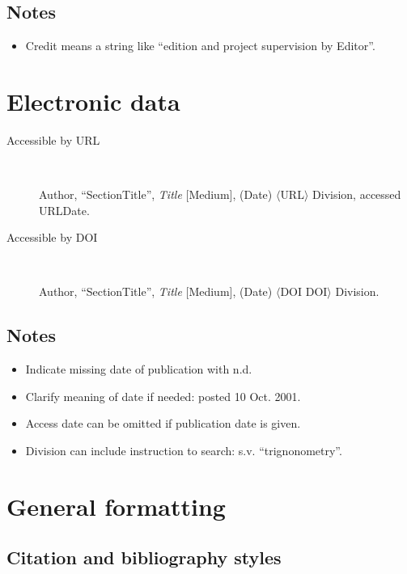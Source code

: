 \documentclass[extrafontsizes,11pt,a4paper,oneside]{memoir}
\newcommand*{\lit}[1]{\textsf{#1}}
\begin{document}
\section{Notes}

\begin{itemize}
  \item Credit means a string like \enquote{edition and project supervision by Editor}.
\end{itemize}

\chapter{Electronic data}\label{sec:electronic}

\begin{description}
  \item[Accessible by URL]~
  \par Author, \enquote{SectionTitle}, \emph{Title} [Medium], (Date) $\langle$URL$\rangle$ Division, \lit{accessed} URLDate.
  \\
  \item[Accessible by DOI]~
  \par Author, \enquote{SectionTitle}, \emph{Title} [Medium], (Date) $\langle$\lit{DOI} DOI$\rangle$ Division.
\end{description}

\section{Notes}

\begin{itemize}
  \item Indicate missing date of publication with n.d.
  \item Clarify meaning of date if needed: posted 10 Oct. 2001.
  \\
  \item Access date can be omitted if publication date is given.
  \item Division can include instruction to search: s.v. \enquote{trignonometry}.
\end{itemize}

\chapter{General formatting}

\section{Citation and bibliography styles}
\end{document}
